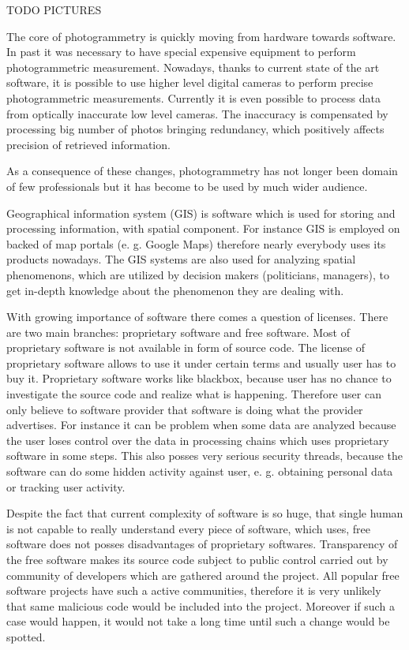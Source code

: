 \documentclass[a4paper,12pt]{report}
\begin{document}
TODO PICTURES


The core of photogrammetry is quickly moving  from  hardware towards software. In past it was necessary to have special 
expensive equipment to perform photogrammetric measurement. Nowadays, thanks to current state of the art software, 
 it is possible to use higher level digital cameras to perform precise photogrammetric measurements. 
 Currently it is even possible to process data from optically inaccurate low level cameras.
 The inaccuracy is compensated by processing big number of photos bringing redundancy, 
 which positively affects precision of retrieved information.
 
As a consequence of these changes, photogrammetry has not longer been domain of few professionals but it has 
become to be used by much wider audience. 

Geographical information system (GIS) is software which is used for storing and processing information,
with spatial component. For instance  GIS is employed on backed of map portals (e. g. Google Maps) therefore nearly 
everybody uses its products nowadays. 
The GIS systems are also used for analyzing spatial phenomenons, which
are utilized by decision makers (politicians, managers), to get in-depth knowledge about the 
phenomenon they are dealing with.

With growing importance of software there comes a question of licenses. There are two 
main branches: proprietary software and free software. Most of proprietary software is not available in 
form of source code. The license of proprietary software allows to use it under certain terms and usually user 
has to buy it. Proprietary software works like blackbox, because user has no chance to investigate the source 
code and realize what is happening. Therefore user can only believe to software provider
that software is doing what the provider advertises. 
For instance it can be problem when some data are analyzed
because the user loses control 
over the data in processing chains which uses proprietary software in some steps.
This also posses very serious security threads, because the software can do some hidden activity against user,
e. g. obtaining personal data or tracking user activity.

Despite the fact that current complexity of software is so huge,
that single human is not capable to really understand every piece of software, which uses,
free software does not posses disadvantages of proprietary softwares.
Transparency of the free software makes its source code subject to public control 
carried out by community of developers which are gathered around the project.
All popular free software projects have such a active communities, therefore it is
very unlikely that same malicious code would be included into the project.
Moreover if such a case would happen, it would not take a long time until such a change 
would be spotted.
\end{document}
